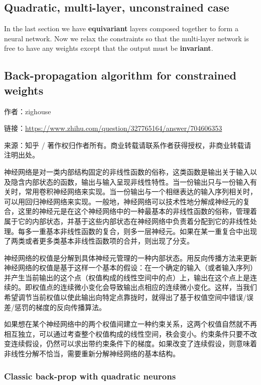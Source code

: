 \subsection{Quadratic, multi-layer, unconstrained case}

In the last section we have \textbf{equivariant} layers composed together to form a neural network.  Now we relax the constraints so that the multi-layer network is free to have any weights except that the output must be \textbf{invariant}.

\subsection{Back-propagation algorithm for constrained weights}

作者：zighouse

链接：\url{https://www.zhihu.com/question/327765164/answer/704606353}

来源：知乎 / 著作权归作者所有。商业转载请联系作者获得授权，非商业转载请注明出处。

神经网络是对一类内部结构固定的非线性函数的俗称，这类函数是输出关于输入以及隐含内部状态的函数，输出与输入呈现非线性特性。当一份输出只与一份输入有关时，常用卷积神经网络来实现。当一份输出与一个相继表达的输入序列相关时，可以用回归神经网络来实现。一般地，神经网络可以技术性地分解成神经元的复合，这里的神经元是在这个神经网络中的一种最基本的非线性函数的俗称，管理着属于它的内部状态，并基于这些内部状态在神经网络中负责着分配到它的非线性处理。每多一重基本非线性函数的复合，则多一层神经元。如果在某一重复合中出现了两类或者更多类基本非线性函数项的合并，则出现了分支。

神经网络的权值是分解到具体神经元管理的一种内部状态。用反向传播方法来更新神经网络的权值是基于这样一个基本的假设：在一个确定的输入（或者输入序列）并产生当前输出的这个点（权值构成的线性空间中的点）上，输出在这个点上是连续的。即权值点的连续微小变化会导致输出点相应的连续微小变化。这样，当我们希望调节当前权值以使此输出向特定点靠拢时，就得出了基于权值空间中错误/误差/惩罚的梯度的反向传播算法。

如果想在某个神经网络中的两个权值间建立一种约束关系，这两个权值自然就不再相互独立，可以通过考查整个权值构成的线性空间，秩会变小。约束条件只要不改变连续假设，仍然可以求出带约束条件下的梯度。如果改变了连续假设，则意味着非线性分解不恰当，需要重新分解神经网络的基本结构。

\subsubsection{Classic back-prop with quadratic neurons}

